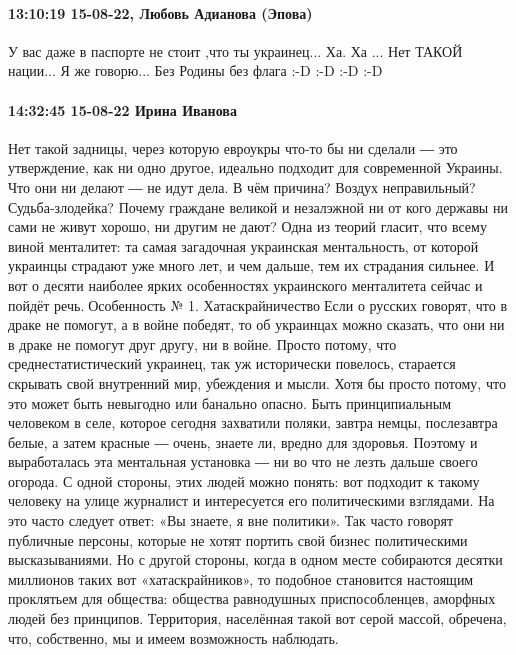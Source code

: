  
 
 
 
 

\paragraph{13:10:19 15-08-22, Любовь Адианова (Эпова)}

У вас даже в паспорте не стоит ,что ты украинец...
Ха. Ха ...
Нет ТАКОЙ нации...
Я же говорю...
Без Родины без флага
:-D :-D :-D :-D

\paragraph{14:32:45 15-08-22 Ирина Иванова}

Нет такой задницы, через которую евроукры что-то бы ни сделали ― это
утверждение, как ни одно другое, идеально подходит для современной Украины. Что
они ни делают ― не идут дела. В чём причина? Воздух неправильный?
Судьба-злодейка? Почему граждане великой и незалэжной ни от кого державы ни
сами не живут хорошо, ни другим не дают? Одна из теорий гласит, что всему виной
менталитет: та самая загадочная украинская ментальность, от которой украинцы
страдают уже много лет, и чем дальше, тем их страдания сильнее. И вот о десяти
наиболее ярких особенностях украинского менталитета сейчас и пойдёт
речь.Особенность № 1. ХатаскрайничествоЕсли о русских говорят, что в драке
не помогут, а в войне победят, то об украинцах можно сказать, что они ни в
драке не помогут друг другу, ни в войне. Просто потому, что
среднестатистический украинец, так уж исторически повелось, старается скрывать
свой внутренний мир, убеждения и мысли. Хотя бы просто потому, что это может
быть невыгодно или банально опасно. Быть принципиальным человеком в селе,
которое сегодня захватили поляки, завтра немцы, послезавтра белые, а затем
красные ― очень, знаете ли, вредно для здоровья. Поэтому и выработалась эта
ментальная установка ― ни во что не лезть дальше своего огорода. С одной
стороны, этих людей можно понять: вот подходит к такому человеку на улице
журналист и интересуется его политическими взглядами. На это часто следует
ответ: «Вы знаете, я вне политики». Так часто говорят публичные персоны,
которые не хотят портить свой бизнес политическими высказываниями. Но с другой
стороны, когда в одном месте собираются десятки миллионов таких вот
«хатаскрайников», то подобное становится настоящим проклятьем для общества:
общества равнодушных приспособленцев, аморфных людей без принципов. Территория,
населённая такой вот серой массой, обречена, что, собственно, мы и имеем
возможность наблюдать.

